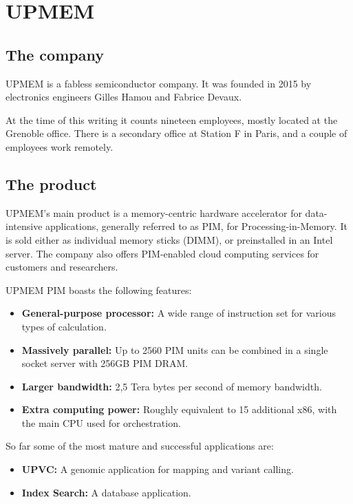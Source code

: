 \chapter{UPMEM}

\section{The company}

UPMEM is a fabless semiconductor company. It was founded in 2015 by electronics engineers Gilles Hamou and Fabrice Devaux.

At the time of this writing it counts nineteen employees, mostly located at the Grenoble office. There is a secondary office at Station F in Paris, and a couple of employees work remotely.

\section{The product}
UPMEM's main product is a memory-centric hardware accelerator for data-intensive applications, generally referred to as PIM, for Processing-in-Memory. It is sold either as individual memory sticks (DIMM), or preinstalled in an Intel server. The company also offers PIM-enabled cloud computing services for customers and researchers.

UPMEM PIM boasts the following features:

\begin{itemize}
    \item \textbf{General-purpose processor:} A wide range of instruction set for various types of calculation.
    \item \textbf{Massively parallel:} Up to 2560 PIM units can be combined in a single socket server with 256GB PIM DRAM.
    \item \textbf{Larger bandwidth:} 2,5 Tera bytes per second of memory bandwidth.
    \item \textbf{Extra computing power:} Roughly equivalent to 15 additional x86, with the main CPU used for orchestration.
\end{itemize}

So far some of the most mature and successful applications are:

\begin{itemize}
    \item \textbf{UPVC:} A genomic application for mapping and variant calling.
    \item \textbf{Index Search:} A database application.
\end{itemize}

